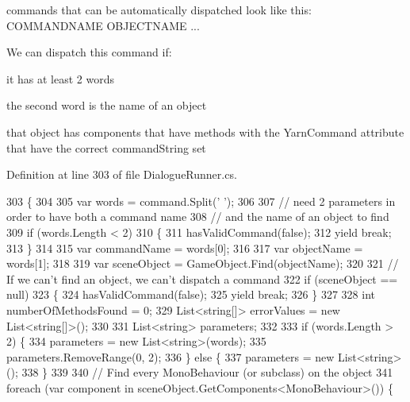 commands that can be automatically dispatched look like this\-: C\-O\-M\-M\-A\-N\-D\-N\-A\-M\-E O\-B\-J\-E\-C\-T\-N\-A\-M\-E    ... 

We can dispatch this command if\-:
\begin{DoxyEnumerate}
\item it has at least 2 words
\item the second word is the name of an object
\item that object has components that have methods with the Yarn\-Command attribute that have the correct command\-String set 
\end{DoxyEnumerate}

Definition at line 303 of file Dialogue\-Runner.\-cs.


\begin{DoxyCode}
303                                                                                                 \{
304 
305             var words = command.Split(\textcolor{charliteral}{' '});
306 
307             \textcolor{comment}{// need 2 parameters in order to have both a command name}
308             \textcolor{comment}{// and the name of an object to find}
309             \textcolor{keywordflow}{if} (words.Length < 2)
310             \{
311                 hasValidCommand(\textcolor{keyword}{false});
312                 yield \textcolor{keywordflow}{break};
313             \}
314 
315             var commandName = words[0];
316 
317             var objectName = words[1];
318 
319             var sceneObject = GameObject.Find(objectName);
320 
321             \textcolor{comment}{// If we can't find an object, we can't dispatch a command}
322             \textcolor{keywordflow}{if} (sceneObject == null)
323             \{
324                 hasValidCommand(\textcolor{keyword}{false});
325                 yield \textcolor{keywordflow}{break};
326             \}
327 
328             \textcolor{keywordtype}{int} numberOfMethodsFound = 0;
329             List<string[]> errorValues = \textcolor{keyword}{new} List<string[]>();
330 
331             List<string> parameters;
332 
333             \textcolor{keywordflow}{if} (words.Length > 2) \{
334                 parameters = \textcolor{keyword}{new} List<string>(words);
335                 parameters.RemoveRange(0, 2);
336             \} \textcolor{keywordflow}{else} \{
337                 parameters = \textcolor{keyword}{new} List<string>();
338             \}
339 
340             \textcolor{comment}{// Find every MonoBehaviour (or subclass) on the object}
341             \textcolor{keywordflow}{foreach} (var component \textcolor{keywordflow}{in} sceneObject.GetComponents<MonoBehaviour>()) \{

\end{DoxyCode}
